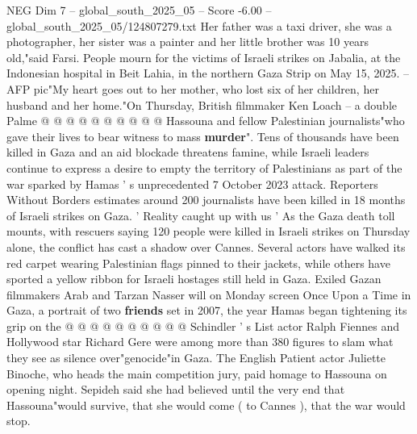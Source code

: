 \begin{textsample}{NEG Dim 7 – global\_south\_2025\_05 – Score -6.00 – global\_south\_2025\_05/124807279.txt}
Her father was a taxi driver, she was a photographer, her sister was a painter and her little brother was 10 years old,"said Farsi.
People mourn for the victims of Israeli strikes on Jabalia, at the Indonesian hospital in Beit Lahia, in the northern Gaza Strip on May 15, 2025. -- AFP pic"My heart goes out to her mother, who lost six of her children, her husband and her home."On Thursday, British filmmaker Ken Loach -- a double Palme @ @ @ @ @ @ @ @ @ @ Hassouna and fellow Palestinian journalists"who gave their lives to bear witness to mass \textbf{murder}".
Tens of thousands have been killed in Gaza and an aid blockade threatens famine, while Israeli leaders continue to express a desire to empty the territory of Palestinians as part of the war sparked by Hamas ' s unprecedented 7 October 2023 attack.
Reporters Without Borders estimates around 200 journalists have been killed in 18 months of Israeli strikes on Gaza. ' Reality caught up with us ' As the Gaza death toll mounts, with rescuers saying 120 people were killed in Israeli strikes on Thursday alone, the conflict has cast a shadow over Cannes.
Several actors have walked its red carpet wearing Palestinian flags pinned to their jackets, while others have sported a yellow ribbon for Israeli hostages still held in Gaza.
Exiled Gazan filmmakers Arab and Tarzan Nasser will on Monday screen Once Upon a Time in Gaza, a portrait of two \textbf{friends} set in 2007, the year Hamas began tightening its grip on the @ @ @ @ @ @ @ @ @ @ Schindler ' s List actor Ralph Fiennes and Hollywood star Richard Gere were among more than 380 figures to slam what they see as silence over"genocide"in Gaza.
The English Patient actor Juliette Binoche, who heads the main competition jury, paid homage to Hassouna on opening night.
Sepideh said she had believed until the very end that Hassouna"would survive, that she would come ( to Cannes ), that the war would stop.

\end{textsample}
